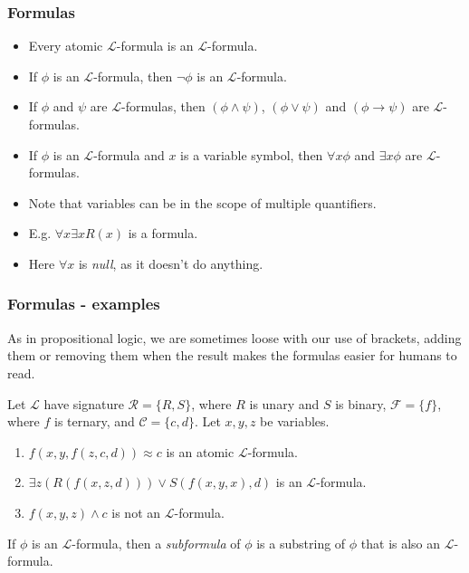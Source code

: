 \documentclass[handout]{beamer}
\newcommand{\sL}{\mathscr{L}}
\newcommand{\cR}{\mathcal{R}}
\newcommand{\cF}{\mathcal{F}}
\newcommand{\cC}{\mathcal{C}}
\begin{document}
\begin{frame}
\frametitle{Formulas}
\begin{definition}[Formula]
\begin{itemize}
\item Every atomic $\sL$-formula is an $\sL$-formula.
\item If $\phi$ is an $\sL$-formula, then $\neg\phi$ is an $\sL$-formula.
\item If $\phi$ and $\psi$ are $\sL$-formulas, then $(\phi\wedge \psi)$, $(\phi\vee\psi)$ and $(\phi\rightarrow \psi)$ are $\sL$-formulas.
\item If $\phi$ is an $\sL$-formula and $x$ is a variable symbol, then $\forall x\phi$ and $\exists x\phi$ are $\sL$-formulas.
\end{itemize} 
\end{definition}
\vspace{0.3cm}
\begin{itemize}
\item Note that variables can be in the scope of multiple quantifiers.
\item E.g. $\forall x\exists xR(x)$ is a formula.
\item Here $\forall x$ is \emph{null}, as it doesn't do anything.
\end{itemize}
\end{frame}

\begin{frame}
\frametitle{Formulas - examples}

As in propositional logic, we are sometimes loose with our use of brackets, adding them or removing them when the result makes the formulas easier for humans to read.

\begin{example}
Let $\sL$ have signature $\cR=\{R,S\}$, where $R$ is unary and $S$ is binary, $\cF=\{f\}$, where $f$ is ternary, and $\cC=\{c,d\}$. Let $x,y,z$ be variables. 
\begin{enumerate}
\item $f(x,y,f(z,c,d)) \approx c$ is an atomic $\sL$-formula.
\item $\exists z(R(f(x,z,d)))\vee S(f(x,y,x),d)$ is an $\sL$-formula.
\item $f(x,y,z) \wedge c$ is not an $\sL$-formula.
\end{enumerate}
\end{example}

\begin{definition}[Subformula]
If $\phi$ is an $\sL$-formula, then a \emph{subformula} of $\phi$ is a substring of $\phi$ that is also an $\sL$-formula.
\end{definition}
\end{frame}
\end{document}
